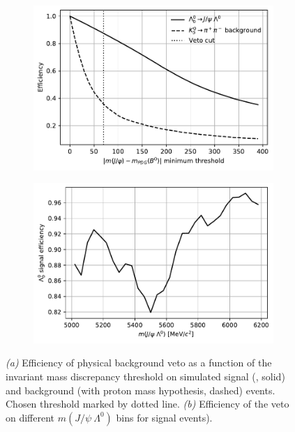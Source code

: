 \begin{figure}[t]
	\centering
	\begin{subfigure}{.45\textwidth}
		\includegraphics[height=.2\textheight]{graphics/04-event_selection/phys_veto_efficiencies.pdf}
		\caption{}
	\end{subfigure}
	\begin{subfigure}{.45\textwidth}
		\includegraphics[height=.2\textheight]{graphics/04-event_selection/phys_veto_sig_efficiencies_per_bin.pdf}
		\caption{}
	\end{subfigure}
	\caption[Efficiency of the physical background veto as a function of the invariant mass discrepancy threshold and of $J/\psi~\Lambda^0$ invariant mass bins.]{\textit{(a)} Efficiency of physical background veto as a function of the invariant mass discrepancy threshold on simulated signal (\demonstratorshort, solid) and background (\physbkgshort with proton mass hypothesis, dashed) events. Chosen threshold marked by dotted line. \textit{(b)} Efficiency of the veto on different $m(J/\psi~\Lambda^0)$ bins for \demonstratorshort signal events).}
\end{figure}

